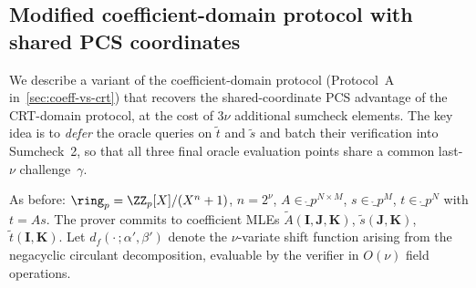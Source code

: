 \subsection{Modified coefficient-domain protocol with shared PCS coordinates}
\label{sec:coeff-domain-modified}

We describe a variant of the coefficient-domain protocol (Protocol~A
in~\cref{sec:coeff-vs-crt}) that recovers the shared-coordinate PCS
advantage of the CRT-domain protocol, at the cost of $3\nu$ additional
sumcheck elements.  The key idea is to \emph{defer} the oracle queries
on $\tilde{t}$ and $\tilde{s}$ and batch their verification into
Sumcheck~2, so that all three final oracle evaluation points share a
common last-$\nu$ challenge~$\gamma$.

As before: $\ring_p = \ZZ_p[X]/(X^n+1)$, $n = 2^\nu$,
$A \in \ring_p^{N \times M}$, $s \in \ring_p^M$, $t \in \ring_p^N$
with $t = As$.  The prover commits to coefficient MLEs
$\tilde{A}(\bm{I},\bm{J},\bm{K})$,
$\tilde{s}(\bm{J},\bm{K})$,
$\tilde{t}(\bm{I},\bm{K})$.
Let $d_f(\cdot\,;\alpha',\beta')$ denote the $\nu$-variate shift
function arising from the negacyclic circulant decomposition,
evaluable by the verifier in $O(\nu)$ field operations.

